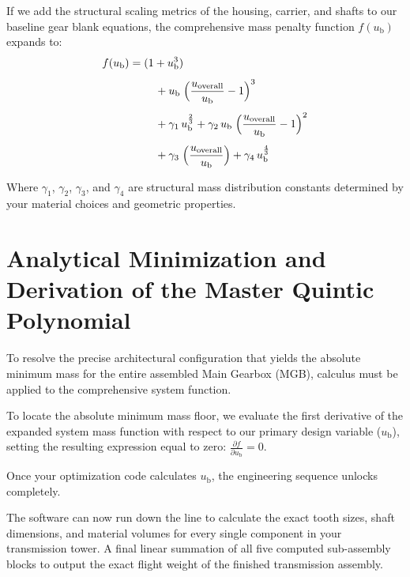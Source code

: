     If we add the structural scaling metrics of the housing, carrier, and shafts to our baseline 
    gear blank equations, the comprehensive mass penalty function $f(u_{\text{b}})$ expands to:
        \begin{equation}
            \label{eq:masspenaltyfunction}
            f(u_{\text{b}})
            = \begin{aligned}[t]
                &(1 + u_{\text{b}}^{3}) \\[4pt]
                &\quad + u_{\text{b}}\;
                \Bigl(\frac{u_{\text{overall}}}{u_{\text{b}}} - 1 \Bigr)^{3} \\[4pt]
                &\quad + \gamma_{1}\,u_{\text{b}}^{\frac{2}{3}}
                + \gamma_{2}\,u_{\text{b}}\;
                \Bigl(\frac{u_{\text{overall}}}{u_{\text{b}}} - 1 \Bigr)^{2} \\[4pt]
                &\quad + \gamma_{3}\;
                \Bigl(\frac{u_{\text{overall}}}{u_{\text{b}}}\Bigr)
                + \gamma_{4}\,u_{\text{b}}^{\frac{4}{3}}
            \end{aligned}
        \end{equation}

    Where $\gamma_{1}$, $\gamma_{2}$, $\gamma_{3}$, and $\gamma_{4}$ are structural mass distribution 
    constants determined by your material choices and geometric properties.

\section{Analytical Minimization and Derivation of the Master Quintic Polynomial}
    To resolve the precise architectural configuration that yields the absolute minimum mass 
    for the entire assembled Main Gearbox (MGB), calculus must be applied to the comprehensive system function.

    To locate the absolute minimum mass floor, we evaluate the first derivative of the expanded system mass 
    function with respect to our primary design variable ($u_{\text{b}}$), setting the resulting 
    expression equal to zero: $\frac{\partial f}{\partial u_{\text{b}}}=0$.
    
    Once your optimization code calculates $u_{\text{b}}$, the engineering sequence unlocks completely.

    The software can now run down the line to calculate the exact tooth sizes, shaft dimensions, 
    and material volumes for every single component in your transmission tower. 
    A final linear summation of all five computed sub-assembly blocks to output the exact flight weight 
    of the finished transmission assembly.

